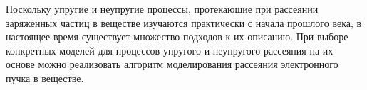 

Поскольку упругие и неупругие процессы, протекающие при рассеянии заряженных частиц в веществе изучаются практически с начала прошлого века, в настоящее время существует множество подходов к их описанию. При выборе конкретных моделей для процессов упругого и неупругого рассеяния на их основе можно реализовать алгоритм моделирования рассеяния электронного пучка в веществе.





